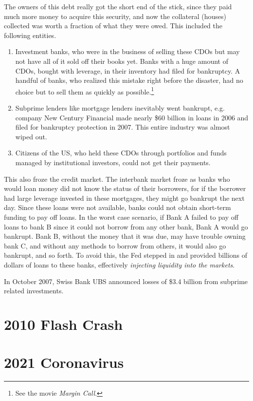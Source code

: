 \documentclass{article}
\begin{document}
  The owners of this debt really got the short end of the stick, since they paid much more money to acquire this security, and now the collateral (houses) collected was worth a fraction of what they were owed. This included the following entities. 
  \begin{enumerate}
    \item Investment banks, who were in the business of selling these CDOs but may not have all of it sold off their books yet. Banks with a huge amount of CDOs, bought with leverage, in their inventory had filed for bankruptcy. A handful of banks, who realized this mistake right before the disaster, had no choice but to sell them as quickly as possible.\footnote{See the movie \textit{Margin Call}. } 
    \item Subprime lenders like mortgage lenders inevitably went bankrupt, e.g. company New Century Financial made nearly \$60 billion in loans in 2006 and filed for bankruptcy protection in 2007. This entire industry was almost wiped out. 
    \item Citizens of the US, who held these CDOs through portfolios and funds managed by institutional investors, could not get their payments. 
  \end{enumerate}
  This also froze the credit market. The interbank market froze as banks who would loan money did not know the status of their borrowers, for if the borrower had large leverage invested in these mortgages, they might go bankrupt the next day. Since these loans were not available, banks could not obtain short-term funding to pay off loans. In the worst case scenario, if Bank A failed to pay off loans to bank B since it could not borrow from any other bank, Bank A would go bankrupt. Bank B, without the money that it was due, may have trouble owning bank C, and without any methods to borrow from others, it would also go bankrupt, and so forth. To avoid this, the Fed stepped in and provided billions of dollars of loans to these banks, effectively \textit{injecting liquidity into the markets}. 

  In October 2007, Swiss Bank UBS announced losses of \$3.4 billion from subprime related investments. 

\section{2010 Flash Crash}


\section{2021 Coronavirus}
\end{document}
